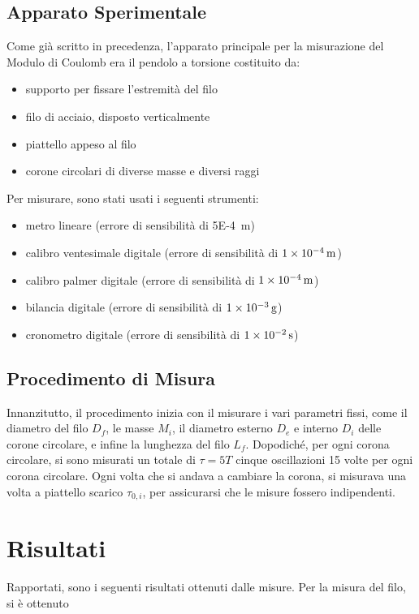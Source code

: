 \documentclass[a4paper]{article}
\begin{document}
\subsection{Apparato Sperimentale}
Come già scritto in precedenza, l'apparato principale per la misurazione del Modulo di Coulomb era il pendolo a torsione costituito da:
\begin{itemize}
    \item supporto per fissare l'estremità del filo
    \item filo di acciaio, disposto verticalmente
    \item piattello appeso al filo 
    \item corone circolari di diverse masse e diversi raggi
\end{itemize}
Per misurare, sono stati usati i seguenti strumenti:
\begin{itemize}
    \item metro lineare (errore di sensibilità di \SI{5E-4}{m})
    \item calibro ventesimale digitale (errore di sensibilità di $\SI{1E-4}{m}$)
    \item calibro palmer digitale (errore di sensibilità di $\SI{1E-4}{m}$)
    \item bilancia digitale (errore di sensibilità di $\SI{1E-3}{g}$)
    \item cronometro digitale (errore di sensibilità di $\SI{1E-2}{s}$)
\end{itemize}

\subsection{Procedimento di Misura}
Innanzitutto, il procedimento inizia con il misurare i vari parametri fissi, come il diametro del filo $D_f$, le masse $M_i$, il diametro esterno $D_e$ e interno $D_i$ delle corone circolare, e infine la lunghezza del filo $L_f$. Dopodiché, per ogni corona circolare, si sono misurati un totale di $\tau = 5T$ cinque oscillazioni 15 volte per ogni corona circolare. Ogni volta che si andava a cambiare la corona, si misurava una volta a piattello scarico $\tau_{0,i}$, per assicurarsi che le misure fossero indipendenti. 

\section{Risultati}
Rapportati, sono i seguenti risultati ottenuti dalle misure. Per la misura del filo, si è ottenuto
\end{document}
